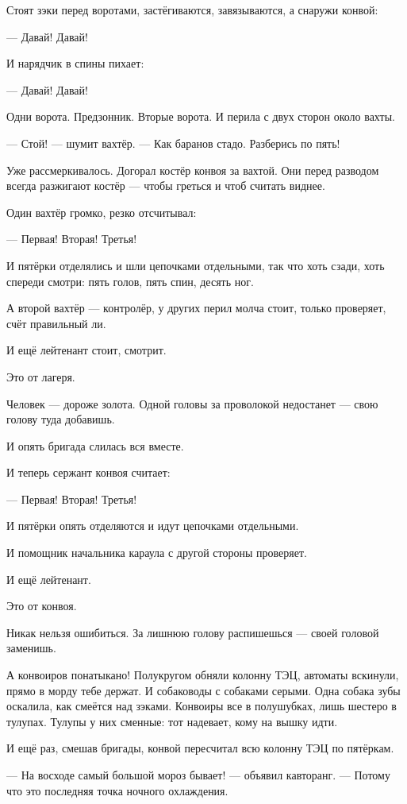 Стоят зэки перед воротами, застёгиваются, завязываются, а снаружи конвой:

--- Давай! Давай!

И нарядчик в спины пихает:

--- Давай! Давай!

Одни ворота. Предзонник. Вторые ворота. И перила с двух сторон около вахты.

--- Стой! --- шумит вахтёр. --- Как баранов стадо. Разберись по пять!

Уже рассмеркивалось. Догорал костёр конвоя за вахтой. Они перед разводом всегда разжигают 
костёр --- чтобы греться и чтоб считать виднее.

Один вахтёр громко, резко отсчитывал:

--- Первая! Вторая! Третья!

И пятёрки отделялись и шли цепочками отдельными, так что хоть сзади, хоть спереди смотри: 
пять голов, пять спин, десять ног.

А второй вахтёр --- контролёр, у других перил молча стоит, только проверяет, счёт правильный 
ли.

И ещё лейтенант стоит, смотрит.

Это от лагеря.

Человек --- дороже золота. Одной головы за проволокой недостанет --- свою голову туда добавишь.

И опять бригада слилась вся вместе.

И теперь сержант конвоя считает:

--- Первая! Вторая! Третья!

И пятёрки опять отделяются и идут цепочками отдельными.

И помощник начальника караула с другой стороны проверяет.

И ещё лейтенант.

Это от конвоя.

Никак нельзя ошибиться. За лишнюю голову распишешься --- своей головой заменишь.

А конвоиров понатыкано! Полукругом обняли колонну ТЭЦ, автоматы вскинули, прямо в морду тебе 
держат. И собаководы с собаками серыми. Одна собака зубы оскалила, как смеётся над зэками. 
Конвоиры все в полушубках, лишь шестеро в тулупах. Тулупы у них сменные: тот надевает, кому на 
вышку идти.

И ещё раз, смешав бригады, конвой пересчитал всю колонну ТЭЦ по пятёркам.

--- На восходе самый большой мороз бывает! --- объявил кавторанг. --- Потому что это последняя 
точка ночного охлаждения.

